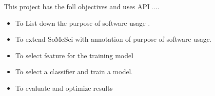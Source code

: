 This project has the foll objectives and uses  \ac{API} ....

\begin{itemize} %

	\item To List down the purpose of software usage .
	\item To extend SoMeSci with annotation of purpose of software usage. 
	\item To select feature for the training model
	\item To select a classifier and train a model.
	\item To evaluate and optimize results 

\end{itemize}
\clearpage
